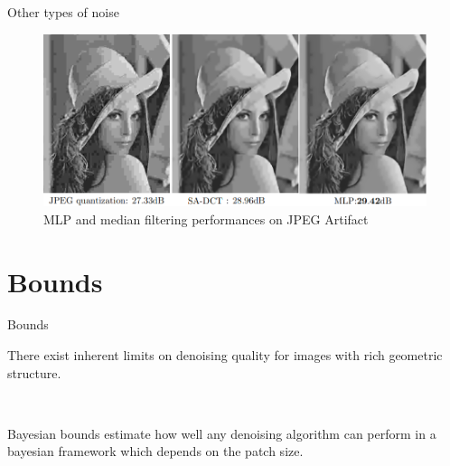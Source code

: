 \documentclass[8pt]{beamer}
\begin{document}
\begin{frame}{Other types of noise}

    \begin{figure}[H]
        \begin{center}
            \includegraphics[scale=0.45]{../datasets/images/Jpgegnoise.png}
            \caption{MLP and median filtering performances on JPEG Artifact}
        \end{center}
    \end{figure}
    
    \end{frame}



\section{Bounds}

\begin{frame}{Bounds}


\begin{mybox}
There exist inherent limits on denoising quality for images with rich geometric structure.
\end{mybox}\

\begin{mybox}
Bayesian bounds estimate how well any denoising algorithm can perform in a bayesian framework which depends on the patch size.
\end{mybox}

\end{frame}
\end{document}
